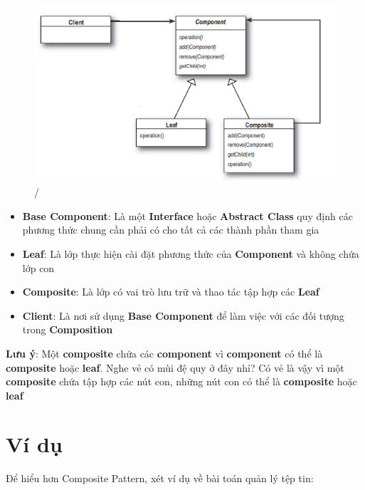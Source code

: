 \begin{figure}[!htb]
    \centering
    \includegraphics[width=\textwidth]{fig/Composite/CompositeDiagram.png}/
\end{figure}

\begin{itemize}
    \item \textbf{Base Component}: Là một \textbf{Interface} hoặc \textbf{Abstract Class} quy định các phương thức chung cần phải có cho tất cả các thành phần tham gia
    \item \textbf{Leaf}: Là lớp thực hiện cài đặt phương thức của \textbf{Component} và không chứa lớp con
    \item \textbf{Composite}: Là lớp có vai trò lưu trữ và thao tác tập hợp các \textbf{Leaf}
    \item \textbf{Client}: Là nơi sử dụng \textbf{Base Component} để làm việc với các đối tượng trong \textbf{Composition}
\end{itemize}\smallskip

\textbf{Lưu ý}: Một \textbf{composite} chứa các \textbf{component} vì \textbf{component} có thể là \textbf{composite} hoặc \textbf{leaf}. Nghe vẻ có mùi đệ quy ở đây nhỉ? Có vẻ là vậy vì một \textbf{composite} chứa tập hợp các nút con, những nút con có thể là \textbf{composite} hoặc \textbf{leaf}\newpage

\section{Ví dụ}

Để hiểu hơn Composite Pattern, xét ví dụ về bài toán quản lý tệp tin:

